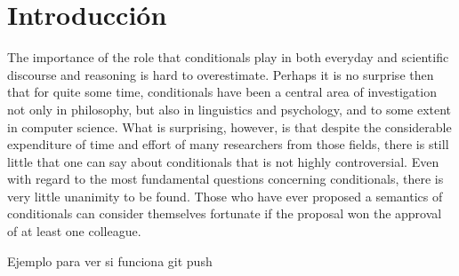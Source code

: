 \chapter*{Introducción}

\noindent The importance of the role that conditionals play in both everyday and scientific discourse and reasoning is hard to overestimate.
Perhaps it is no surprise then that for quite some time, conditionals have been a central area of investigation not only in philosophy, but also in linguistics and psychology, and to some extent in computer science.
What is surprising, however, is that despite the considerable expenditure of time and effort of many researchers from those fields, there is still little that one can say about conditionals that is not highly controversial. 
Even with regard to the most fundamental questions concerning conditionals, there is very little unanimity to be found. 
Those who have ever proposed a semantics of conditionals can consider themselves fortunate if the proposal won the approval of at least one colleague. %


Ejemplo para ver si funciona git push
